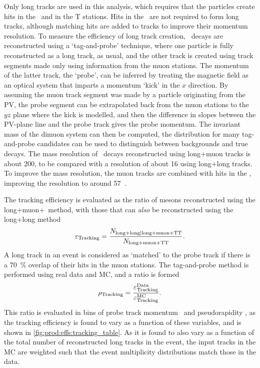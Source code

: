 Only long tracks are used in this analysis, which requires that the particles 
create hits in the \velo\ and in the T stations.
Hits in the \ttracker\ are not required to form long tracks, although matching 
hits are added to tracks to improve their momentum resolution.
To measure the efficiency of long track creation, \JpsiTomumu\ decays are 
reconstructed using a `tag-and-probe' technique, where one particle is fully 
reconstructed as a long track, as usual, and the other track is created using 
track segments made only using information from the muon stations.
The momentum of the latter track, the `probe', can be inferred by treating the 
magnetic field as an optical system that imparts a momentum `kick' in the $x$ 
direction.
By assuming the muon track segment was made by a particle originating from the 
\ac{PV}, the probe segment can be extrapolated back from the muon stations to 
the $yz$ plane where the kick is modelled, and then the difference in slopes 
between the \ac{PV}-plane line and the probe track gives the probe momentum.
The invariant mass of the dimuon system can then be computed, the distribution 
for many tag-and-probe candidates can be used to distinguish between 
backgrounds and true \PJpsi decays.
The mass resolution of \JpsiTomumu\ decays reconstructed using long+muon tracks 
is about \SI{200}{\MeVcc}, to be compared with a resolution of about 
\SI{16}{\MeVcc} using long+long tracks.
To improve the mass resolution, the muon tracks are combined with hits in the 
\ttracker, improving the resolution to around 
\SI{57}{\MeVcc}~\cite{Aaij:2014pwa,DeCian:2013zua}.

The tracking efficiency is evaluated as the ratio of \PJpsi mesons 
reconstructed using the long+muon+\ttracker\ method, with those that can 
\emph{also} be reconstructed using the long+long method
\begin{equation}
  \eff_{\text{Tracking}} = 
  \frac{%
    N_{\text{long+long}|\text{long+muon+TT}}
  }{%
    N_{\text{long+muon+TT}}
  }.
  \label{eqn:prod:effs:tracking_eff}
\end{equation}
A long track in an event is considered as `matched' to the probe track if there 
is a \SI{70}{\percent} overlap of their hits in the muon stations.
The tag-and-probe method is performed using real data and \ac{MC}, and a ratio 
is formed
\begin{equation}
  \efftracking = \frac{%
    \eff_{\text{Tracking}}^{\text{Data}}
  }{%
    \eff_{\text{Tracking}}^{\text{MC}}
  }.
  \label{eqn:prod:effs:tracking_ratio}
\end{equation}
This ratio is evaluated in bins of probe track momentum \ptot\ and 
pseudorapidity \Eta, as the tracking efficiency is found to vary as a function 
of these variables, and is shown in \cref{fig:prod:effs:tracking_table}.
As it is found to also vary as a function of the total number of reconstructed 
long tracks in the event, the input tracks in the \ac{MC} are weighted such 
that the event multiplicity distributions match those in the data.

